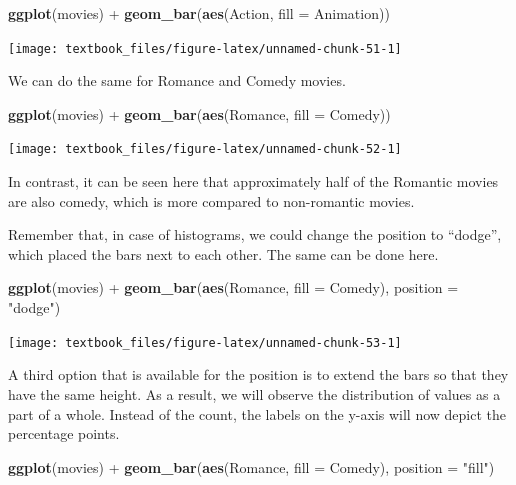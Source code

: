 \documentclass[]{tufte-book}
\newenvironment{Shaded}{}{}
\newcommand{\DataTypeTok}[1]{\textcolor[rgb]{0.56,0.13,0.00}{#1}}
\newcommand{\KeywordTok}[1]{\textcolor[rgb]{0.00,0.44,0.13}{\textbf{#1}}}
\newcommand{\NormalTok}[1]{#1}
\newcommand{\OperatorTok}[1]{\textcolor[rgb]{0.40,0.40,0.40}{#1}}
\newcommand{\StringTok}[1]{\textcolor[rgb]{0.25,0.44,0.63}{#1}}
\begin{document}
\begin{Shaded}
\begin{Highlighting}[]
\KeywordTok{ggplot}\NormalTok{(movies) }\OperatorTok{+}
\StringTok{    }\KeywordTok{geom_bar}\NormalTok{(}\KeywordTok{aes}\NormalTok{(Action, }\DataTypeTok{fill =}\NormalTok{ Animation)) }
\end{Highlighting}
\end{Shaded}

\texttt{[image: textbook\_files/figure-latex/unnamed-chunk-51-1]}

We can do the same for Romance and Comedy movies.

\begin{Shaded}
\begin{Highlighting}[]
\KeywordTok{ggplot}\NormalTok{(movies) }\OperatorTok{+}
\StringTok{    }\KeywordTok{geom_bar}\NormalTok{(}\KeywordTok{aes}\NormalTok{(Romance, }\DataTypeTok{fill =}\NormalTok{ Comedy)) }
\end{Highlighting}
\end{Shaded}

\texttt{[image: textbook\_files/figure-latex/unnamed-chunk-52-1]}

In contrast, it can be seen here that approximately half of the Romantic movies are also comedy, which is more compared to non-romantic movies.

Remember that, in case of histograms, we could change the position to ``dodge'', which placed the bars next to each other. The same can be done here.

\begin{Shaded}
\begin{Highlighting}[]
\KeywordTok{ggplot}\NormalTok{(movies) }\OperatorTok{+}
\StringTok{    }\KeywordTok{geom_bar}\NormalTok{(}\KeywordTok{aes}\NormalTok{(Romance, }\DataTypeTok{fill =}\NormalTok{ Comedy), }\DataTypeTok{position =} \StringTok{"dodge"}\NormalTok{) }
\end{Highlighting}
\end{Shaded}

\texttt{[image: textbook\_files/figure-latex/unnamed-chunk-53-1]}

A third option that is available for the position is to extend the bars so that they have the same height. As a result, we will observe the distribution of values as a part of a whole. Instead of the count, the labels on the y-axis will now depict the percentage points.

\begin{Shaded}
\begin{Highlighting}[]
\KeywordTok{ggplot}\NormalTok{(movies) }\OperatorTok{+}
\StringTok{    }\KeywordTok{geom_bar}\NormalTok{(}\KeywordTok{aes}\NormalTok{(Romance, }\DataTypeTok{fill =}\NormalTok{ Comedy), }\DataTypeTok{position =} \StringTok{"fill"}\NormalTok{) }
\end{Highlighting}
\end{Shaded}
\end{document}
